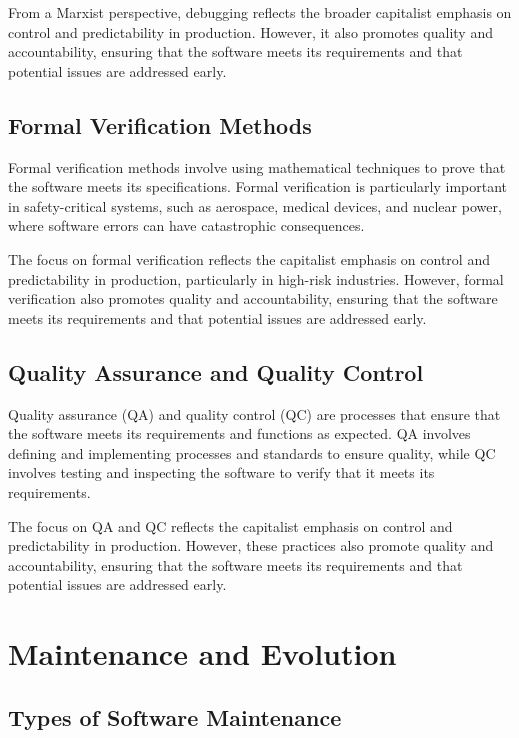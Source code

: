\begin{refsection}
\begin{multicols}{2}
{From a Marxist perspective, debugging reflects the broader capitalist emphasis on control and predictability in production. However, it also promotes quality and accountability, ensuring that the software meets its requirements and that potential issues are addressed early.

\subsection{Formal Verification Methods}

Formal verification methods involve using mathematical techniques to prove that the software meets its specifications. Formal verification is particularly important in safety-critical systems, such as aerospace, medical devices, and nuclear power, where software errors can have catastrophic consequences.

The focus on formal verification reflects the capitalist emphasis on control and predictability in production, particularly in high-risk industries. However, formal verification also promotes quality and accountability, ensuring that the software meets its requirements and that potential issues are addressed early.

\subsection{Quality Assurance and Quality Control}

Quality assurance (QA) and quality control (QC) are processes that ensure that the software meets its requirements and functions as expected. QA involves defining and implementing processes and standards to ensure quality, while QC involves testing and inspecting the software to verify that it meets its requirements.

The focus on QA and QC reflects the capitalist emphasis on control and predictability in production. However, these practices also promote quality and accountability, ensuring that the software meets its requirements and that potential issues are addressed early.

}
\end{multicols}
\newpage

\section{Maintenance and Evolution}
\begin{multicols}{2}
{\small

\subsection{Types of Software Maintenance}

}
\end{multicols}
\end{refsection}
